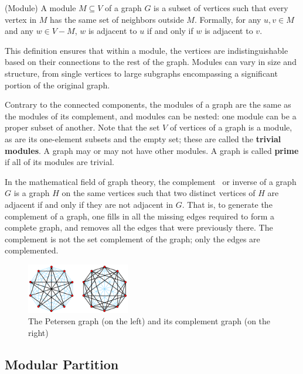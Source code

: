 \begin{mydef}
(Module)
    A module $M \subseteq V$ of a graph $G$ is a subset of vertices such that every vertex in $M$ has the same set of neighbors outside $M$.
    Formally, for any $u, v \in M$ and any $w \in V - M$, $w$ is adjacent to $u$ if and only if $w$ is adjacent to $v$.
\end{mydef}

This definition ensures that within a module, the vertices are indistinguishable based on their connections to the rest of the graph.
Modules can vary in size and structure, from single vertices to large subgraphs encompassing a significant portion of the original graph.

Contrary to the connected components, the modules of a graph are the same as the modules of its complement, and modules can be nested: one module can be a proper subset of another.
Note that the set $V$ of vertices of a graph is a module, as are its one-element subsets and the empty set; these are called the \textbf{trivial modules}.
A graph may or may not have other modules.
A graph is called \textbf{prime} if all of its modules are trivial.

In the mathematical field of graph theory, the complement~\cite{complementgraphwikipedia} or inverse of a graph $G$ is a graph $H$ on the same vertices such that two distinct vertices of $H$ are adjacent if and only if they are not adjacent in $G$.
That is, to generate the complement of a graph, one fills in all the missing edges required to form a complete graph, and removes all the edges that were previously there.
The complement is not the set complement of the graph; only the edges are complemented.

\begin{figure}[!h]
    \centering
    \includegraphics[width=0.40\textwidth]{images/graphs/Petersen_graph_complement}
    \caption{The Petersen graph (on the left) and its complement graph (on the right) \cite{complementgraphwikipedia}}
    \label{fig:the}
\end{figure}


\subsection*{Modular Partition}\label{subsec:modular-partition}

